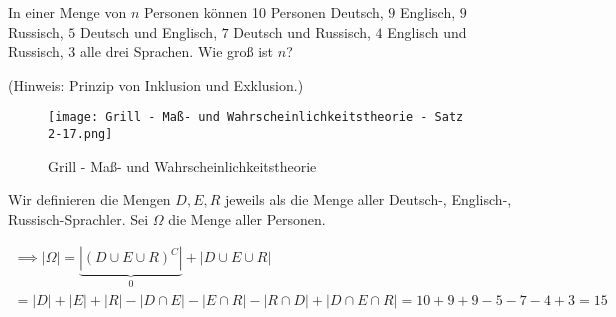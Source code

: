 
\begin{exercise}

In einer Menge von $n$ Personen können 10 Personen Deutsch, $9$ Englisch, $9$ Russisch, $5$ Deutsch und Englisch, $7$ Deutsch und Russisch, $4$ Englisch und Russisch, $3$ alle drei Sprachen.
Wie groß ist $n$?

(Hinweis: Prinzip von Inklusion und Exklusion.)

\end{exercise}


\begin{solution}

\phantom{}


\begin{figure}[h!]
  \centering
  \texttt{[image: Grill - Maß- und Wahrscheinlichkeitstheorie - Satz 2-17.png]}
  \caption{Grill - Maß- und Wahrscheinlichkeitstheorie}
\end{figure}

Wir definieren die Mengen $D, E, R$ jeweils als die Menge aller Deutsch-, Englisch-, Russisch-Sprachler.
Sei $\Omega$ die Menge aller Personen.

\begin{multline*}
  \implies
  |\Omega|
  =
  \underbrace{|(D \cup E \cup R)^C|}_0
  +
  |D \cup E \cup R| \\
  =
  |D| + |E| + |R| - |D \cap E| - |E \cap R| - |R \cap D| + |D \cap E \cap R|
  =
  10 + 9 + 9 - 5 - 7 - 4 + 3
  =
  15
\end{multline*}

\end{solution}

